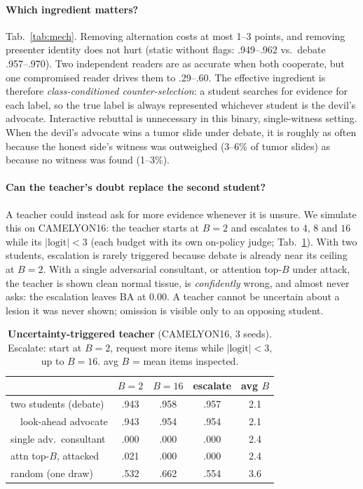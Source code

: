 \documentclass[10pt,twocolumn,letterpaper]{article}
\begin{document}
\paragraph{Which ingredient matters?} Tab.~\ref{tab:mech}. Removing alternation costs at most 1--3 points, and removing presenter identity does not hurt (static without flags: .949--.962 vs.\ debate .957--.970). Two independent readers are as accurate when both cooperate, but one compromised reader drives them to .29--.60. The effective ingredient is therefore \emph{class-conditioned counter-selection}: a student searches for evidence for each label, so the true label is always represented whichever student is the devil's advocate. Interactive rebuttal is unnecessary in this binary, single-witness setting. When the devil's advocate wins a tumor slide under debate, it is roughly as often because the honest side's witness was outweighed (3--6\% of tumor slides) as because no witness was found (1--3\%).

\paragraph{Can the teacher's doubt replace the second student?} A teacher could instead ask for more evidence whenever it is unsure. We simulate this on CAMELYON16: the teacher starts at $B{=}2$ and escalates to $4$, $8$ and $16$ while its $|\text{logit}|<3$ (each budget with its own on-policy judge; Tab.~\ref{tab:ask}). With two students, escalation is rarely triggered because debate is already near its ceiling at $B{=}2$. With a single adversarial consultant, or attention top-$B$ under attack, the teacher is shown clean normal tissue, is \emph{confidently} wrong, and almost never asks: the escalation leaves BA at 0.00. A teacher cannot be uncertain about a lesion it was never shown; omission is visible only to an opposing student.
\begin{table}[t]\centering\small
\caption{\textbf{Uncertainty-triggered teacher} (CAMELYON16, 3 seeds). Escalate: start at $B{=}2$, request more items while $|\text{logit}|<3$, up to $B{=}16$. avg $B$ = mean items inspected.}\label{tab:ask}
\setlength{\tabcolsep}{3pt}
\begin{tabular}{@{}lcccc@{}}\toprule
 & $B{=}2$ & $B{=}16$ & escalate & avg $B$\\\midrule
two students (debate) & .943 & .958 & .957 & 2.1\\
\ \ look-ahead advocate & .943 & .954 & .954 & 2.1\\
single adv.\ consultant & .000 & .000 & .000 & 2.4\\
attn top-$B$, attacked & .021 & .000 & .000 & 2.4\\
random (one draw) & .532 & .662 & .554 & 3.6\\\bottomrule
\end{tabular}\end{table}
\end{document}
